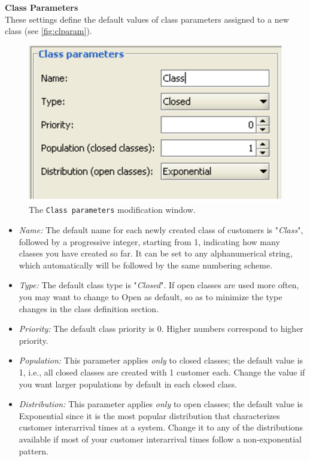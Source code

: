 \noindent \textbf{Class Parameters}\\
These settings define the default values of class parameters
assigned to a new class (see \autoref{fig:clparam}).
\begin{figure}[htb]
    \begin{center}
        \includegraphics[scale=.5]{img/jsimg/9.2.eps}
    \end{center}
    \caption{The \texttt{Class parameters} modification window.}
    \label{fig:clparam}
\end{figure}
\begin{itemize}
\item \emph{Name:} The default name for each newly created class
of customers is "\emph{Class}", followed by a progressive integer,
starting from 1, indicating how many classes you have created so
far. It can be set to any alphanumerical string, which
automatically will be followed by the same numbering scheme. \item
\emph{Type:} The default class type is "\emph{Closed}". If open
classes are used more often, you may want to change to Open as
default, so as to minimize the type changes in the class
definition section. \item \emph{Priority:} The default class
priority is 0. Higher numbers correspond to higher priority. \item
\emph{Population:} This parameter applies \emph{only} to closed
classes; the default value is 1, i.e., all closed classes are
created with 1 customer each. Change the value if you want larger
populations by default in each closed class. \item
\emph{Distribution:} This parameter applies \emph{only} to open
classes; the default value is Exponential since it is the most
popular distribution that characterizes customer interarrival
times at a system. Change it to any of the distributions available
if most of your customer interarrival times follow a
non-exponential pattern.
\end{itemize}

